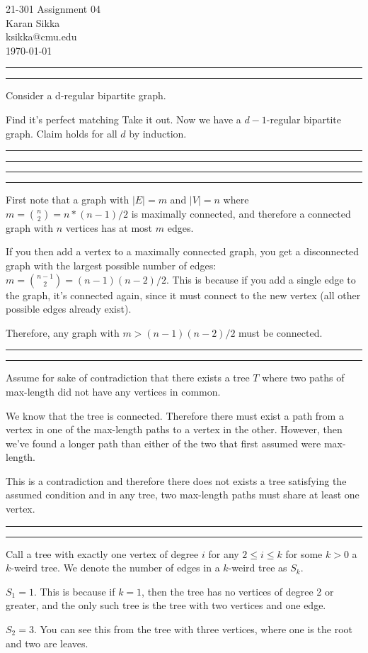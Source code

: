 \documentclass[11pt,letterpaper]{article}
\makeatletter
\newcommand{\question}[1] {\vspace{.25in} \hrule\vspace{0.5em}
\noindent{\bf #1} \vspace{0.5em}
\hrule \vspace{.10in}}
\newcommand{\myname}{Karan Sikka}
\newcommand{\myandrew}{ksikka@cmu.edu}
\newcommand{\myhwnum}{04}
\makeatother
\begin{document}
\medskip

\thispagestyle{plain}
\begin{center}                  %
{\Large 21-301 Assignment \myhwnum} \\
\myname \\
\myandrew \\
\today
\end{center}


\question{1}
Consider a d-regular bipartite graph.

Find it's perfect matching
Take it out. Now we have a $d-1$-regular bipartite graph. Claim holds for all $d$ by induction.

\question{2}

\question{3}
First note that a graph with $|E| = m$ and $|V| = n$ where $m = {n \choose 2} = n*(n - 1)/2$ is maximally connected, and therefore a connected graph with $n$ vertices has at most $m$ edges.

If you then add a vertex to a maximally connected graph, you get a disconnected graph with the largest possible number of edges: $m = {n-1 \choose 2} = (n-1)(n-2)/2$.
This is because if you add a single edge to the graph, it's connected again, since it must connect to the new vertex (all other possible edges already exist).

Therefore, any graph with $m > (n-1)(n-2)/2$ must be connected.

\question{4}
Assume for sake of contradiction that there exists a tree $T$ where two paths of max-length did not have any vertices in common.

We know that the tree is connected.
Therefore there must exist a path from a vertex in one of the max-length paths to a vertex in the other.
However, then we've found a longer path than either of the two that first assumed were max-length.

This is a contradiction and therefore there does not exists a tree satisfying the assumed condition and in any tree, two max-length paths must share at least one vertex.

\question{5}
Call a tree with exactly one vertex of degree $i$ for any $2 \leq i \leq k$ for some $k > 0$ a $k$-weird tree.
We denote the number of edges in a $k$-weird tree as $S_k$.

$S_1 = 1$. This is because if $k=1$, then the tree has no vertices of degree 2 or greater, and the only such tree is the tree with two vertices and one edge.

$S_2 = 3$. You can see this from the tree with three vertices, where one is the root and two are leaves.
\end{document}
